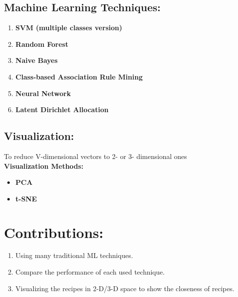 \documentclass{article}
\begin{document}
\subsection{Machine Learning Techniques:}

\begin{enumerate}
    \item \textbf{SVM (multiple classes version)}
    \item \textbf{Random Forest}
    \item \textbf{Naive Bayes} 
    \item \textbf{Class-based Association Rule Mining}
    \item \textbf{Neural Network}
    \item \textbf{Latent Dirichlet Allocation}
\end{enumerate} 

\subsection{Visualization: }
To reduce V-dimensional vectors to 2- or 3- dimensional ones\\
\textbf{Visualization Methods:}
\begin{itemize}
    \item \textbf{PCA}
    \item \textbf{t-SNE} 
\end{itemize}
\section{Contributions:}

\begin{enumerate}
    \item Using many traditional ML techniques.
    \item Compare the performance of each used technique.
    \item Visualizing the recipes in 2-D/3-D space to show the closeness of recipes.
\end{enumerate} 
\end{document}
